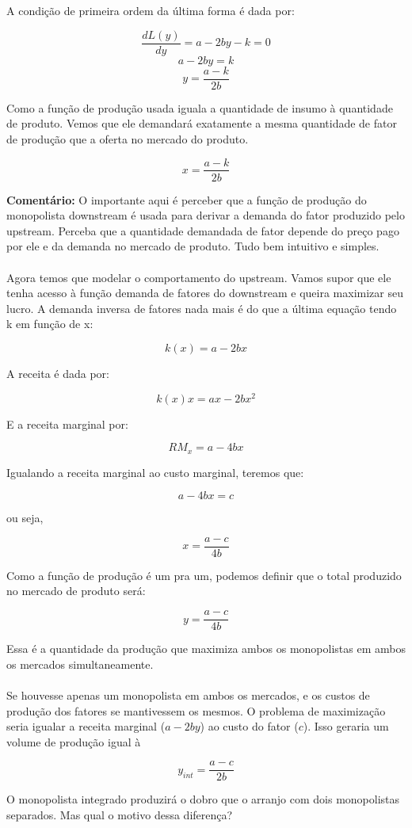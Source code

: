\documentclass[a4paper,11pt,oneside]{book}
\theoremstyle{definition}
\theoremstyle{break}
\begin{document}
A condição de primeira ordem da última forma é dada por:

$$ \frac{d L(y)}{d y} = a - 2by - k = 0 $$
$$ a - 2by = k $$
$$ y = \frac{a - k}{2b} $$

Como a função de produção usada iguala a quantidade de insumo à quantidade de produto. Vemos que ele demandará exatamente a mesma quantidade de fator de produção que a oferta no mercado do produto.

$$ x = \frac{a - k}{2b} $$

\textbf{Comentário:} O importante aqui é perceber que a função de produção do monopolista downstream é usada para derivar a demanda do fator produzido pelo upstream. Perceba que a quantidade demandada de fator depende do preço pago por ele e da demanda no mercado de produto. Tudo bem intuitivo e simples.
\\
\\
Agora temos que modelar o comportamento do upstream. Vamos supor que ele tenha acesso à função demanda de fatores do downstream e queira maximizar seu lucro. A demanda inversa de fatores nada mais é do que a última equação tendo k em função de x:

$$ k(x) = a - 2bx $$

A receita é dada por:

$$ k(x)x = ax - 2bx^2 $$

E a receita marginal por:

$$ RM_x = a - 4bx $$

Igualando a receita marginal ao custo marginal, teremos que:

$$ a - 4bx = c $$

ou seja,

$$ x = \frac{a - c}{4b} $$

Como a função de produção é um pra um, podemos definir que o total produzido no mercado de produto será:

$$ y = \frac{a - c}{4b} $$

Essa é a quantidade da produção que maximiza ambos os monopolistas em ambos os mercados simultaneamente.
\\
\\
Se houvesse apenas um monopolista em ambos os mercados, e os custos de produção dos fatores se mantivessem os mesmos. O problema de maximização seria igualar a receita marginal ($a - 2by$) ao custo do fator ($c$). Isso geraria um volume de produção igual à

$$ y_{int} = \frac{a - c}{2b}$$

O monopolista integrado produzirá o dobro que o arranjo com dois monopolistas separados. Mas qual o motivo dessa diferença?
\end{document}
